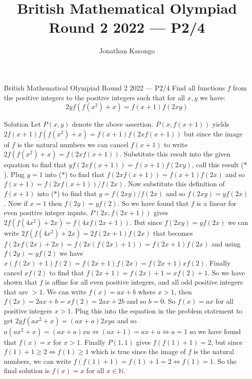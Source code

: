 \documentclass{article}
\author{Jonathan Kasongo}
\title{British Mathematical Olympiad Round 2 2022 --- P2/4}
\begin{document}
\maketitle

\begin{problem}{British Mathematical Olympiad Round 2 2022 --- P2/4}
Find all functions $f$ from the positive integers to the positive integers such that for all $x, y$ we have:
$$
2 y f(f(x^2)+x)=f(x+1) f(2 x y)
$$
\end{problem}

\begin{solution}{Solution}
Let $P(x, y)$ denote the above assertion. $P(x, f(x+1))$ yields
$2 f(x+1) f(f(x^2)+x) = f(x+1) f(2xf(x+1))$ but since the image of $f$ is
the natural numbers we can cancel $f(x+1)$ to write
$2 f(f(x^2)+x) = f(2xf(x+1))$. Substitute this result into the given
equation to find that $y f(2x f(x+1)) = f(x+1) f(2xy)$, call this result
($*$). Plug $y=1$ into ($*$) to find that
$f(2x f(x+1)) = f(x+1) f(2x)$ and so $f(x+1) = f(2x f(x+1)) / f(2x)$.
Now substitute this definition of $f(x+1)$ into ($*$) to find that
$y = f(2xy) / f(2x)$ and so $f(2xy) = yf(2x)$. Now if $x=1$ then
$f(2y) = yf(2)$. So we have found that $f$ is a linear for even positive
integer inputs. $P(2x, f(2x+1))$ gives $2f(f(4x^2)+2x) = f(4xf(2x+1))$.
But since $f(2xy) = yf(2x)$ we can write
$2f(f(4x^2)+2x) = 2f(2x+1)f(2x)$ that becomes
$f(2xf(2x)+2x) = f(2x(f(2x)+1)) = f(2x+1)f(2x)$ and using $f(2y) = yf(2)$
we have $x(f(2x)+1)f(2) = f(2x+1)f(2x) = f(2x+1)xf(2)$. Finally cancel
$xf(2)$ to find that $f(2x+1) = f(2x) + 1 = xf(2) + 1$. So we have shown
that $f$ is affine for all even positive integers, and all odd positive
integers that are $>1$. We can write $f(x) = ax + b$ where $x > 1$,
then $f(2x) = 2ax + b = xf(2) = 2ax + 2b$ and so $b = 0$. So $f(x) = ax$
for all positive integers $x > 1$. Plug this into the equation in the
problem statement to get $2y f(ax^2 + x) = (ax + a) 2xya$ and so
$a(ax^2 + x) = (ax + a) xa \iff (ax + 1) = ax + a \iff a = 1$ so we have
found that $f(x) = x$ for $x > 1$. Finally $P(1,1)$ gives
$f(f(1)+1)=2$, but since $f(1)+1 \geq 2 \iff f(1) \geq 1$ which is true
since the image of $f$ is the natural numbers, we can write
$f(f(1)+1)=f(1)+1=2 \iff f(1)=1$. So the final solution is $f(x)=x$ for all
$x \in \mathbb{N}$.
\end{solution}
\end{document}
